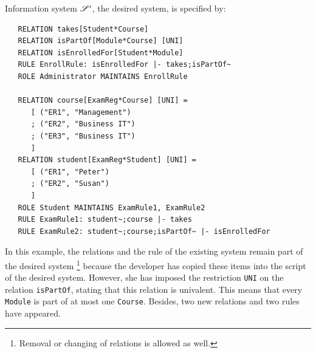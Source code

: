 \documentclass{elsarticle}
\begin{document}
   Information system $\mathscr{S}'$, the desired system, is specified by:
\begin{verbatim}
   RELATION takes[Student*Course]
   RELATION isPartOf[Module*Course] [UNI]
   RELATION isEnrolledFor[Student*Module]
   RULE EnrollRule: isEnrolledFor |- takes;isPartOf~
   ROLE Administrator MAINTAINS EnrollRule
   
   RELATION course[ExamReg*Course] [UNI] =
      [ ("ER1", "Management")
      ; ("ER2", "Business IT")
      ; ("ER3", "Business IT")
      ]
   RELATION student[ExamReg*Student] [UNI] =
      [ ("ER1", "Peter")
      ; ("ER2", "Susan")
      ]
   ROLE Student MAINTAINS ExamRule1, ExamRule2
   RULE ExamRule1: student~;course |- takes
   RULE ExamRule2: student~;course;isPartOf~ |- isEnrolledFor
\end{verbatim}
   In this example, the relations and the rule of the existing system remain part of the desired system%
\footnote{Removal or changing of relations is allowed as well.}
   because the developer has copied these items into the script of the desired system.
   However, she has imposed the restriction \verb-UNI- on the relation {\tt isPartOf}, stating that this relation is univalent.
   This means that every \verb-Module- is part of at most one \verb-Course-.
   Besides, two new relations and two rules have appeared.
\end{document}
